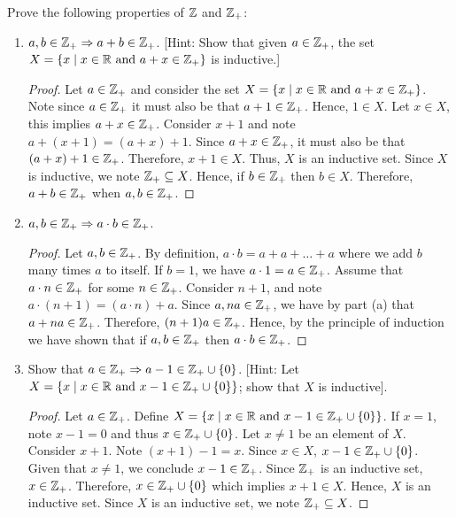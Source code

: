 \documentclass[12pt]{article}
\begin{document}
	 Prove the following properties of $\mathbb{Z}$ and $\mathbb{Z}_{+}$:
	\begin{enumerate}[label=(\alph*)]
		\item $a, b \in \mathbb{Z}_{+} \Rightarrow a + b \in \mathbb{Z}_{+}$. [Hint: Show that given $a \in \mathbb{Z}_{+}$, the set 
		$X = \{x \mid x \in \mathbb{R} \text{ and } a + x \in \mathbb{Z}_{+}\}$ is inductive.]
		\begin{proof}
			Let $a \in \mathbb{Z}_{+}$ and consider the set $X = \{x \mid x \in \mathbb{R} \text{ and } a + x \in \mathbb{Z}_{+}\}$.
			Note since $a \in \mathbb{Z}_{+}$ it must also be that $a + 1 \in \mathbb{Z}_{+}$. Hence, $1 \in X$.
			Let $x \in X$, this implies $a + x \in \mathbb{Z}_{+}$. Consider $x + 1$ and note 
			$a + (x + 1) = (a + x) + 1$. Since $a + x \in \mathbb{Z}_{+}$, it must also be that $(a + x) + 1 \in \mathbb{Z}_{+}$.
			Therefore, $x + 1 \in X$. Thus, $X$ is an inductive set. Since $X$ is inductive, we note
			$\mathbb{Z}_{+} \subseteq X$. Hence, if $b \in \mathbb{Z}_{+}$ then $b \in X$. Therefore, 
			$a + b \in \mathbb{Z}_{+}$ when $a,b \in \mathbb{Z}_{+}$. 
		\end{proof}
		\item $a, b \in \mathbb{Z}_{+} \Rightarrow a \cdot b \in \mathbb{Z}_{+}$.
		\begin{proof}
			Let $a, b \in \mathbb{Z}_{+}$. By definition, $a \cdot b = a + a + \ldots + a$ where we add $b$ many
			times $a$ to itself. If $b = 1$, we have $a \cdot 1 = a \in \mathbb{Z}_{+}$. Assume that 
			$a \cdot n \in \mathbb{Z}_{+}$ for some $n \in \mathbb{Z}_{+}$. Consider $n + 1$, and note 
			$a \cdot (n + 1) = (a \cdot n) + a$. Since $a, na \in \mathbb{Z}_{+}$, we have by part (a) that
			$a + na \in \mathbb{Z}_{+}$. Therefore, $(n + 1)a \in \mathbb{Z}_{+}$. Hence, by the principle of induction
			we have shown that if $a, b \in \mathbb{Z}_{+}$ then $a \cdot b \in \mathbb{Z}_{+}$.
		\end{proof}
		\item Show that $a \in \mathbb{Z}_{+} \Rightarrow a - 1 \in \mathbb{Z}_{+} \cup \{0\}$. 
		[Hint: Let $X = \{x \mid x \in \mathbb{R} \text{ and } x - 1 \in \mathbb{Z}_{+}\cup\{0\}\}$; show that $X$ is inductive].
		\begin{proof}
			Let $a \in \mathbb{Z}_{+}$. Define $X = \{x \mid x \in \mathbb{R} \text{ and } x - 1 \in \mathbb{Z}_{+}\cup\{0\}\}$.
			If $x = 1$, note $x - 1 = 0$ and thus $x \in \mathbb{Z}_{+} \cup \{0\}$. Let $x \neq 1$ be an element of
			$X$. Consider $x + 1$. Note $(x + 1) - 1 = x$. Since $x \in X$, $x - 1 \in \mathbb{Z}_{+} \cup \{0\}$.
			Given that $x \neq 1$, we conclude $x - 1 \in \mathbb{Z}_{+}$. Since $\mathbb{Z}_{+}$ is an inductive set,
			$x \in \mathbb{Z}_{+}$. Therefore, $x \in \mathbb{Z}_{+} \cup \{0\}$ which implies $x + 1 \in X$. Hence,
			$X$ is an inductive set. Since $X$ is an inductive set, we note $\mathbb{Z}_{+} \subseteq X$.

\end{proof}
\end{enumerate}
\end{document}
